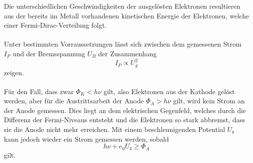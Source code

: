 \noindent
Die unterschiedlichen Geschwindigkeiten der ausgelösten Elektronen resultieren aus der bereits im Metall vorhandenen kinetischen Energie der
Elektronen, welche einer Fermi-Dirac-Verteilung folgt.
\\
\\
\noindent
Unter bestimmten Vorraussetzungen lässt sich zwischen dem gemessenen Strom $I_{P}$ und der Bremsspannung $U_B$ der Zusammenhang
\begin{equation*}
    I_{P}\propto U^2_g
\end{equation*}
zeigen.
\\
\\\noindent
Für den Fall, dass zwar $\Phi_K<h\nu$ gilt, also Elektronen aus der Kathode gelöst werden, aber für die Austrittsarbeit der Anode
$\Phi_A>h\nu$ gilt, wird kein Strom an der Anode gemessen. Dies liegt an dem elektrischen Gegenfeld, welches durch die Differenz der
Fermi-Niveaus entsteht und die Elektronen so stark abbremst, dass sie die Anode nicht mehr erreichen.
Mit einem beschleunigenden Potential $U_b$ kann jedoch wieder ein Strom gemessen werden, sobald
\begin{equation}
    h\nu+e_0U_{b}\geq \Phi_A
    \label{eqn:ausgleichb}
\end{equation}
gilt.
